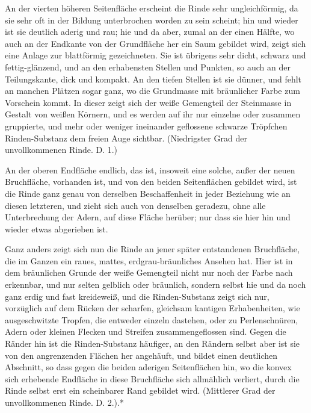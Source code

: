\documentclass[a4paper, 11pt, oneside, german]{article}
\begin{document}
An der vierten höheren Seitenfläche erscheint die Rinde sehr ungleichförmig, da sie sehr oft in der Bildung unterbrochen worden zu sein scheint; hin und wieder ist sie deutlich aderig und rau; hie und da aber, zumal an der einen Hälfte, wo auch an der Endkante von der Grundfläche her ein Saum gebildet wird, zeigt sich eine Anlage zur blattförmig gezeichneten. Sie ist übrigens sehr dicht, schwarz und fettig-glänzend, und an den erhabensten Stellen und Punkten, so auch an der Teilungskante, dick und kompakt. An den tiefen Stellen ist sie dünner, und fehlt an manchen Plätzen sogar ganz, wo die Grundmasse mit bräunlicher Farbe zum Vorschein kommt. In dieser zeigt sich der weiße Gemengteil der Steinmasse in Gestalt von weißen Körnern, und es werden auf ihr nur einzelne oder zusammen gruppierte, und mehr oder weniger ineinander geflossene schwarze Tröpfchen Rinden-Substanz dem freien Auge sichtbar. (Niedrigster Grad der unvollkommenen Rinde. D. 1.)

An der oberen Endfläche endlich, das ist, insoweit eine solche, außer der neuen Bruchfläche, vorhanden ist, und von den beiden Seitenflächen gebildet wird, ist die Rinde ganz genau von derselben Beschaffenheit in jeder Beziehung wie an diesen letzteren, und zieht sich auch von denselben geradezu, ohne alle Unterbrechung der Adern, auf diese Fläche herüber; nur dass sie hier hin und wieder etwas abgerieben ist.

Ganz anders zeigt sich nun die Rinde an jener später entstandenen Bruchfläche, die im Ganzen ein raues, mattes, erdgrau-bräunliches Ansehen hat. Hier ist in dem bräunlichen Grunde der weiße Gemengteil nicht nur noch der Farbe nach erkennbar, und nur selten gelblich oder bräunlich, sondern selbst hie und da noch ganz erdig und fast kreideweiß, und die Rinden-Substanz zeigt sich nur, vorzüglich auf dem Rücken der scharfen, gleichsam kantigen Erhabenheiten, wie ausgeschwitzte Tropfen, die entweder einzeln dastehen, oder zu Perlenschnüren, Adern oder kleinen Flecken und Streifen zusammengeflossen sind. Gegen die Ränder hin ist die Rinden-Substanz häufiger, an den Rändern selbst aber ist sie von den angrenzenden Flächen her angehäuft, und bildet einen deutlichen Abschnitt, so dass gegen die beiden aderigen Seitenflächen hin, wo die konvex sich erhebende Endfläche in diese Bruchfläche sich allmählich verliert, durch die Rinde selbst erst ein scheinbarer Rand gebildet wird. (Mittlerer Grad der unvollkommenen Rinde. D. 2.).*
\end{document}
